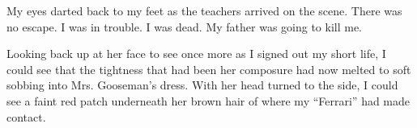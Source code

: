 My eyes darted back to my feet as the teachers arrived on the scene. There was no escape. I was in trouble. I was dead. My father was going to kill me.

Looking back up at her face to see once more as I signed out my short life, I could see that the tightness that had been her composure had now melted to soft sobbing into Mrs. Gooseman's dress. With her head turned to the side, I could see a faint red patch underneath her brown hair of where my ``Ferrari'' had made contact.
